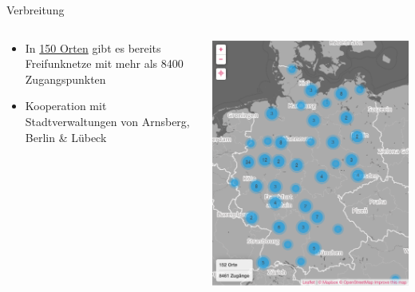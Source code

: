 \documentclass[t]{beamer}
\begin{document}
\begin{frame}{Verbreitung}
	\begin{columns}
		\begin{column}{0.6\textwidth}
			\begin{itemize}
				\item In  \href{http://freifunk.net/wie-mache-ich-mit/community-finden/}{150 Orten} gibt es bereits Freifunknetze mit mehr als 8400 Zugangspunkten
				\item Kooperation mit Stadtverwaltungen von Arnsberg, Berlin \& Lübeck
			\end{itemize}
		\end{column}
		\begin{column}{0.4\textwidth}
			\begin{center}
				\includegraphics[width=\textwidth]{Bilder/Deutschlandkarte}
			\end{center}
		\end{column}
	\end{columns}
\end{frame}
\end{document}
